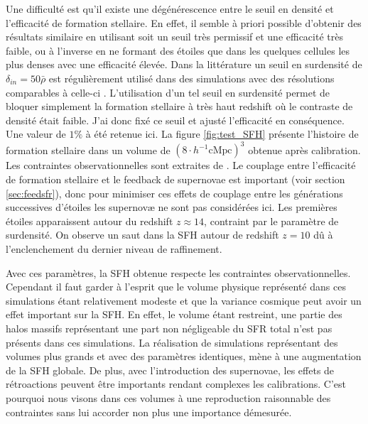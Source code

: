Une difficulté est qu'il existe une dégénérescence entre le seuil en densité et l'efficacité de formation stellaire.
En effet, il semble à priori possible d'obtenir des résultats similaire en utilisant soit un seuil très permissif et une efficacité très faible, ou à l'inverse en ne formant des étoiles que dans les quelques cellules les plus denses avec une efficacité élevée.
Dans la littérature un seuil en surdensité de $\delta_{in}=50\bar{\rho}$ est régulièrement utilisé dans des simulations avec des résolutions comparables à celle-ci \citep{ocvirk_cosmic_2015,stinson_star_2006}.
L'utilisation d'un tel seuil en surdensité permet de bloquer simplement la formation stellaire à très haut redshift où le contraste de densité était faible.
J'ai donc fixé ce seuil et ajusté l'efficacité en conséquence.
Une valeur de $1\%$ à été retenue ici.
La figure \ref{fig:test_SFH} présente l'histoire de formation stellaire dans un volume de $\left( 8\cdot h^{-1} \mathrm{cMpc} \right)^3$ obtenue après calibration. 
Les contraintes observationnelles sont extraites de \cite{bouwens_reionization_2015}.
Le couplage entre l'efficacité de formation stellaire et le feedback de supernovae est important (voir section \ref{sec:feedsfr}), donc pour minimiser ces effets de couplage entre les générations successives d'étoiles les supernovæ ne sont pas considérées ici.
Les premières étoiles apparaissent autour du redshift $z\approx 14$, contraint par le paramètre de surdensité.
On observe un saut dans la \ac{SFH} autour de redshift $z=10$ dû à l'enclenchement du dernier niveau de raffinement.

Avec ces paramètres, la \ac{SFH} obtenue respecte les contraintes observationnelles.
Cependant il faut garder à l'esprit que le volume physique représenté dans ces simulations étant relativement modeste et que la variance cosmique peut avoir un effet important sur la \ac{SFH}.
En effet, le volume étant restreint, une partie des halos massifs représentant une part non négligeable du \ac{SFR} total n'est pas présents dans ces simulations.
La réalisation de simulations représentant des volumes plus grands et avec des paramètres identiques, mène à une augmentation de la \ac{SFH} globale.
De plus, avec l'introduction des supernovae, les effets de rétroactions peuvent être importants rendant complexes les calibrations.
C’est pourquoi nous visons dans ces volumes à une reproduction raisonnable des contraintes sans lui accorder non plus une importance démesurée.

